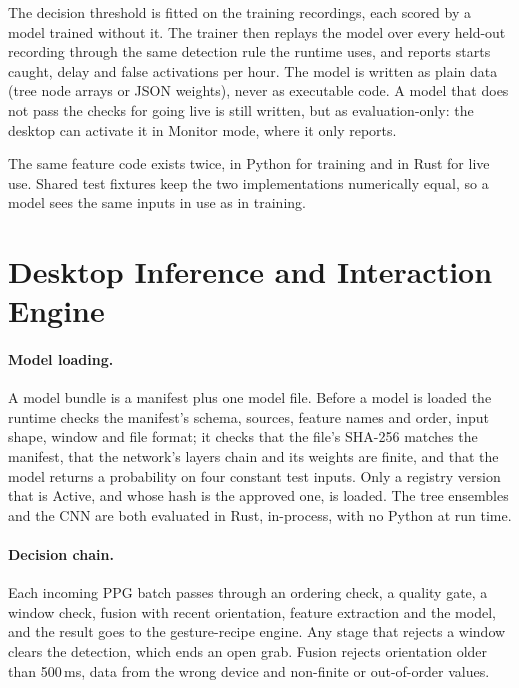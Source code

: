 The decision threshold is fitted on the training recordings, each scored by a model trained without it. The trainer then replays the model over every held-out recording through the same detection rule the runtime uses, and reports starts caught, delay and false activations per hour. The model is written as plain data (tree node arrays or JSON weights), never as executable code. A model that does not pass the checks for going live is still written, but as evaluation-only: the desktop can activate it in Monitor mode, where it only reports.

The same feature code exists twice, in Python for training and in Rust for live use. Shared test fixtures keep the two implementations numerically equal, so a model sees the same inputs in use as in training.

\section{Desktop Inference and Interaction Engine}

\paragraph{Model loading.} A model bundle is a manifest plus one model file. Before a model is loaded the runtime checks the manifest's schema, sources, feature names and order, input shape, window and file format; it checks that the file's SHA-256 matches the manifest, that the network's layers chain and its weights are finite, and that the model returns a probability on four constant test inputs. Only a registry version that is Active, and whose hash is the approved one, is loaded. The tree ensembles and the CNN are both evaluated in Rust, in-process, with no Python at run time.

\paragraph{Decision chain.} Each incoming PPG batch passes through an ordering check, a quality gate, a window check, fusion with recent orientation, feature extraction and the model, and the result goes to the gesture-recipe engine. Any stage that rejects a window clears the detection, which ends an open grab. Fusion rejects orientation older than 500\,ms, data from the wrong device and non-finite or out-of-order values.

